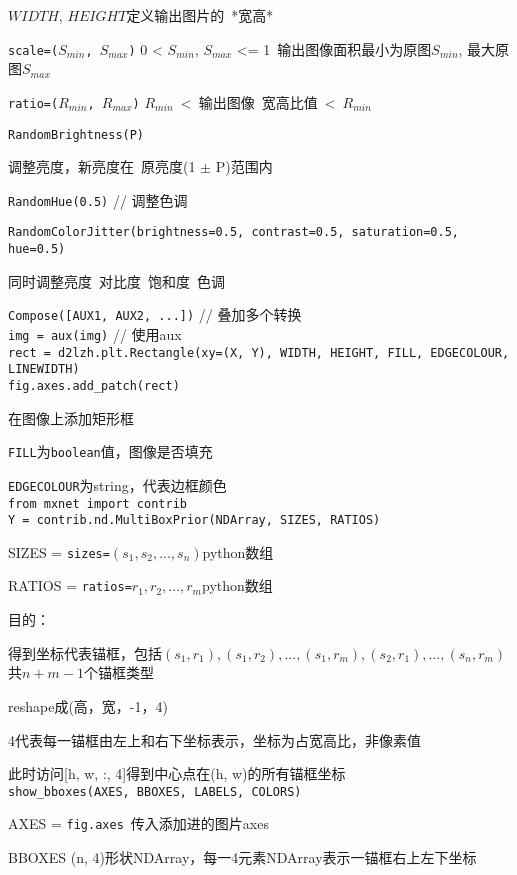 \documentclass[UTF8]{ctexart}
\begin{document}
  \quad $WIDTH$, $HEIGHT$定义输出图片的\ *宽高*
    
  \quad \texttt{scale=($S_{min}$, $S_{max}$)} 0 < $S_{min}$, $S_{max}$ <= 1\ 输出图像面积最小为原图$S_{min}$, 最大原图$S_{max}$ 
    
  \quad \texttt{ratio=($R_{min}$, $R_{max}$)} $R_{min}$\ <\ 输出图像\ 宽高比值\ <\ $R_{min}$
  
  \texttt{RandomBrightness(P)} 

  \quad 调整亮度，新亮度在\ 原亮度(1 $\pm$ P)范围内

  \texttt{RandomHue(0.5)} // 调整色调

  \texttt{RandomColorJitter(brightness=0.5, contrast=0.5, saturation=0.5, hue=0.5)}

  \quad 同时调整亮度\ 对比度\ 饱和度\ 色调
  
  \texttt{Compose([AUX1, AUX2, ...])} // 叠加多个转换\\
\texttt{img = aux(img)} // 使用aux\\
\texttt{rect = d2lzh.plt.Rectangle(xy=(X, Y), WIDTH, HEIGHT, FILL, EDGECOLOUR, LINEWIDTH)}\\
\texttt{fig.axes.add\_patch(rect)}
  
  在图像上添加矩形框

  \texttt{FILL}为\texttt{boolean}值，图像是否填充

  \texttt{EDGECOLOUR}为string，代表边框颜色\\
\texttt{from mxnet import contrib}\\
\texttt{Y = contrib.nd.MultiBoxPrior(NDArray, SIZES, RATIOS)}

  SIZES = \texttt{sizes=}$(s_1, s_2,...,s_n)$python数组

  RATIOS = \texttt{ratios=}$r_1, r_2, ...,r_m$python数组

  目的：
  
  \quad 得到坐标代表锚框，包括$(s_1, r_1), (s_1, r_2), ..., (s_1, r_m), (s_2, r_1), ..., (s_n, r_m)$共$n+m-1$个锚框类型

  \quad reshape成(高，宽，-1，4)

  \quad 4代表每一锚框由左上和右下坐标表示，坐标为占宽高比，非像素值

  \quad \quad 此时访问[h, w, :, 4]得到中心点在(h, w)的所有锚框坐标\\
\texttt{show\_bboxes(AXES, BBOXES, LABELS, COLORS)}

  AXES = \texttt{fig.axes}\ 传入添加进的图片axes

  BBOXES (n, 4)形状NDArray，每一4元素NDArray表示一锚框右上左下坐标
\end{document}
